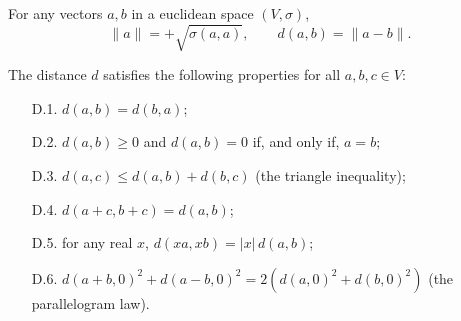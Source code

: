 For any vectors $a, b$ in a euclidean space $(V, \sigma)$,
$$\|a\| = +\sqrt{\sigma(a, a)}, \qquad d(a, b) = \|a - b\|.$$

The distance $d$ satisfies the following properties for all $a, b, c \in V$:
\begin{itemize}
\item[D.1.] $d(a, b) = d(b, a)$;
\item[D.2.] $d(a, b) \geq 0$ and $d(a, b) = 0$ if, and only if, $a = b$;
\item[D.3.] $d(a, c) \leq d(a, b) + d(b, c)$ (the triangle inequality);
\item[D.4.] $d(a + c, b + c) = d(a, b)$;
\item[D.5.] for any real $x$, $d(xa, xb) = |x|\, d(a, b)$;
\item[D.6.] $d(a + b, 0)^2 + d(a - b, 0)^2 = 2(d(a, 0)^2 + d(b, 0)^2)$ (the parallelogram law).
\end{itemize}
